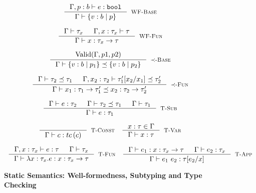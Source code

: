 \begin{figure}[ht!]


$$\inference
    {\hastype{\Gamma, p:b}{\reft}{\tbbool}}
    {\isWellFormed{\Gamma}{\tref{b}{p}}}
    [\wtBase]
$$

$$
\inference
    {
    \isWellFormed{\Gamma}{\tau_x} &&
	\isWellFormed{\Gamma, x:\tau_x}{\tau}
    }
    {\isWellFormed{\Gamma}{\tfun{x}{\tau_x}{\tau}}}
    [\wtFun]
$$


\medskip {}

$$
\inference
   {\text{Valid}(\Gamma, p1, p2)}
   {\isSubType{\Gamma}{\tref{b}{p_1}}{\tref{b}{p_2}}}
   [\tsubBase]
$$

$$
\inference
   {\isSubType{\Gamma}{\tau_2}{\tau_1} &
	\isSubType{\Gamma, x_2:{\tau_2}}{\SUBST{\tau_1'}{x_1}{x_2}}{\tau_2'}	
   }
   {\isSubType{\Gamma}
	  {\tfun{x_1}{\tau_1}{\tau_1'}}
	  {\tfun{x_2}{\tau_2}{\tau_2'}}
}[\tsubFun]
$$


\medskip {}

$$\begin{array}{cc}

\inference
  {  \hastype{\Gamma}{e}{\tau_2} && \isSubType{\Gamma}{\tau_2}{\tau_1} 
  && \isWellFormed{\Gamma}{\tau_1}
  }
  {\hastype{\Gamma}{e}{\tau_1}}
  [\tsub]
\end{array}$$

$$\begin{array}{cc}

\inference
  {}
  {\hastype{\Gamma}{c}{\tc{c}}}
  [\tconst]
&
\inference
  {x:\tau \in \Gamma}
  {\hastype{\Gamma}{x}{\tau}} 
  [\tvariable]

\end{array}$$

$$\begin{array}{cc}

\inference
  {\hastype{\Gamma, x:\tau_x}{e}{\tau} &&     
  \isWellFormed{\Gamma}{\tau_x}
  }
  {\hastype{\Gamma}{\efunt{x}{\tau_x}{e}}{\tfun{x}{\tau_x}{\tau}}}
  [\tfunction]
&
\inference
  {\hastype{\Gamma}{e_1}{\tfun{x}{\tau_x}{\tau}} &&
   \hastype{\Gamma}{e_2}{\tau_x}
  }
  {\hastype{\Gamma}{\eapp{e_1}{e_2}}{\tau[e_2/x]}} 
  [\tapp]

\end{array}$$

\caption{\textbf{Static Semantics: Well-formedness, Subtyping and Type Checking}}
\label{fig:rules}
\end{figure}
